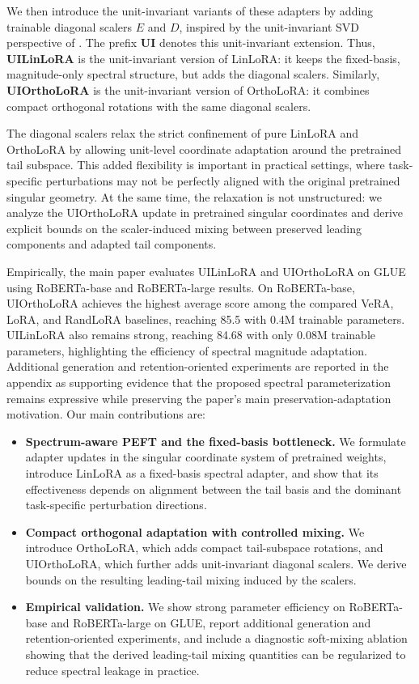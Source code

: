 \documentclass{article}
\begin{document}
We then introduce the unit-invariant variants of these adapters by adding trainable diagonal scalers \(E\) and \(D\), inspired by the unit-invariant SVD perspective of \citet{uhlmann2018generalized}. The prefix \textbf{UI} denotes this unit-invariant extension. Thus, \textbf{UILinLoRA} is the unit-invariant version of LinLoRA: it keeps the fixed-basis, magnitude-only spectral structure, but adds the diagonal scalers. Similarly, \textbf{UIOrthoLoRA} is the unit-invariant version of OrthoLoRA: it combines compact orthogonal rotations with the same diagonal scalers.

The diagonal scalers relax the strict confinement of pure LinLoRA and OrthoLoRA by allowing unit-level coordinate adaptation around the pretrained tail subspace. This added flexibility is important in practical settings, where task-specific perturbations may not be perfectly aligned with the original pretrained singular geometry. At the same time, the relaxation is not unstructured: we analyze the UIOrthoLoRA update in pretrained singular coordinates and derive explicit bounds on the scaler-induced mixing between preserved leading components and adapted tail components.

Empirically, the main paper evaluates UILinLoRA and UIOrthoLoRA on GLUE using RoBERTa-base and RoBERTa-large results. On RoBERTa-base, UIOrthoLoRA achieves the highest average score among the compared VeRA, LoRA, and RandLoRA baselines, reaching 85.5 with 0.4M trainable parameters. UILinLoRA also remains strong, reaching 84.68 with only 0.08M trainable parameters, highlighting the efficiency of spectral magnitude adaptation. Additional generation and retention-oriented experiments are reported in the appendix as supporting evidence that the proposed spectral parameterization remains expressive while preserving the paper's main preservation-adaptation motivation.
Our main contributions are:
\begin{itemize}
    \item \textbf{Spectrum-aware PEFT and the fixed-basis bottleneck.}
    We formulate adapter updates in the singular coordinate system of pretrained weights, introduce LinLoRA as a fixed-basis spectral adapter, and show that its effectiveness depends on alignment between the tail basis and the dominant task-specific perturbation directions.

    \item \textbf{Compact orthogonal adaptation with controlled mixing.}
    We introduce OrthoLoRA, which adds compact tail-subspace rotations, and UIOrthoLoRA, which further adds unit-invariant diagonal scalers. We derive bounds on the resulting leading-tail mixing induced by the scalers.

    \item \textbf{Empirical validation.}
    We show strong parameter efficiency on RoBERTa-base and RoBERTa-large on GLUE,
    report additional generation and retention-oriented experiments, and include a diagnostic soft-mixing ablation showing that the derived leading-tail mixing quantities can be regularized to reduce spectral leakage in practice.
\end{itemize}
\end{document}
